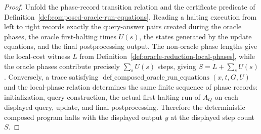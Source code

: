 \begin{proof}
  Unfold the phase-record transition relation and the certificate predicate of
  Definition~\ref{def:composed-oracle-run-equations}.  Reading a halting
  execution from left to right records exactly the query-answer pairs created
  during the oracle phases, the oracle first-halting times $U(s)$, the states
  generated by the update equations, and the final postprocessing output.  The
  non-oracle phase lengths give the local-cost witness
  $L$ from Definition~\ref{def:oracle-reduction-local-phases}, while the
  oracle phases contribute precisely $\sum_s U(s)$ steps, giving
  $S=L+\sum_s U(s)$.
  Conversely, a trace satisfying
  $\operatorname{def\_composed\_oracle\_run\_equations}(x,t,G,U)$ and the
  local-phase relation determines the same finite sequence of phase records:
  initialization, query construction, the actual first-halting run of $A_Q$ on
  each displayed query, update, and final postprocessing.  Therefore the
  deterministic composed program halts with the displayed output $y$ at the
  displayed step count $S$.
\end{proof}

